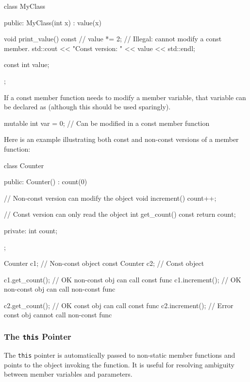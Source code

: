 \begin{codeblock}[language=C++]
class MyClass {
public:
    MyClass(int x) : value(x) {}
        
    void print_value() const {
        // value *= 2; // Illegal: cannot modify a const member.
        std::cout << "Const version: " << value << std::endl;
    }
    
    const int value;
};
\end{codeblock}

\begin{tipsblock}
    If a const member function needs to modify a member variable, that variable can be declared as  (although this should be used sparingly).

\begin{codeblock}[language=C++, numbers=none]
mutable int var = 0; // Can be modified in a const member function
\end{codeblock}
\end{tipsblock}
\begin{exampleblock}
    Here is an example illustrating both const and non-const versions of a member function:
    \begin{codeblock}[language=C++]
class Counter {
public:
    Counter() : count(0) {}

    // Non-const version can modify the object
    void increment() {
        count++;
    }

    // Const version can only read the object
    int get_count() const {
        return count;
    }

private:
    int count;
};

Counter c1;       // Non-const object
const Counter c2; // Const object

c1.get_count();   // OK      non-const obj can call const func
c1.increment();   // OK      non-const obj can call non-const func

c2.get_count();   // OK      const obj can call const func
c2.increment();   // Error   const obj cannot call non-const func
    \end{codeblock}
\end{exampleblock}

\subsubsection{The \texttt{this} Pointer}

The \texttt{this} pointer is automatically passed to non-static member functions and points to the object invoking the function. It is useful for resolving ambiguity between member variables and parameters.

